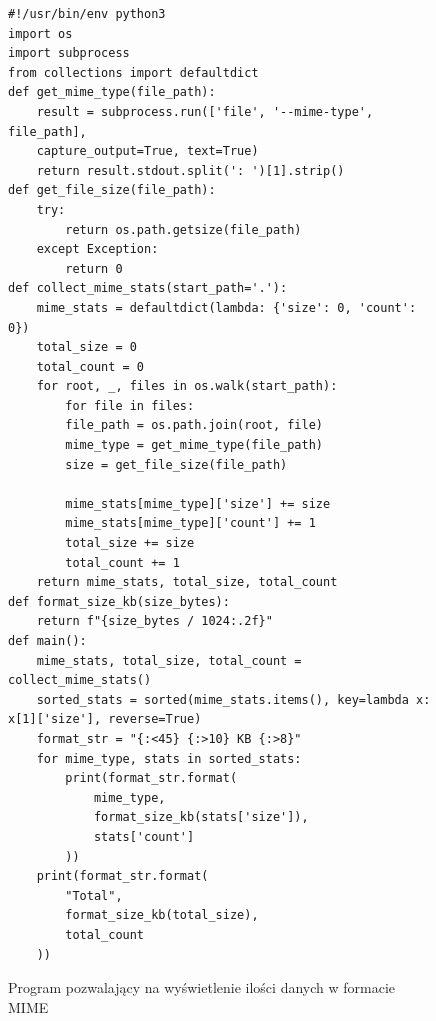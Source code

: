 \begin{figure}[bp]
    \centering
    \begin{lstlisting}
#!/usr/bin/env python3
import os
import subprocess
from collections import defaultdict
def get_mime_type(file_path):
    result = subprocess.run(['file', '--mime-type', file_path], 
    capture_output=True, text=True)
    return result.stdout.split(': ')[1].strip()
def get_file_size(file_path):
    try:
        return os.path.getsize(file_path)
    except Exception:
        return 0
def collect_mime_stats(start_path='.'):
    mime_stats = defaultdict(lambda: {'size': 0, 'count': 0})
    total_size = 0
    total_count = 0
    for root, _, files in os.walk(start_path):
        for file in files:
        file_path = os.path.join(root, file)
        mime_type = get_mime_type(file_path)
        size = get_file_size(file_path)
        
        mime_stats[mime_type]['size'] += size
        mime_stats[mime_type]['count'] += 1
        total_size += size
        total_count += 1
    return mime_stats, total_size, total_count
def format_size_kb(size_bytes):
    return f"{size_bytes / 1024:.2f}"
def main():
    mime_stats, total_size, total_count = collect_mime_stats()
    sorted_stats = sorted(mime_stats.items(), key=lambda x: x[1]['size'], reverse=True)
    format_str = "{:<45} {:>10} KB {:>8}"
    for mime_type, stats in sorted_stats:
        print(format_str.format(
            mime_type,
            format_size_kb(stats['size']),
            stats['count']
        ))
    print(format_str.format(
        "Total",
        format_size_kb(total_size),
        total_count
    ))
    \end{lstlisting}
    \caption{Program pozwalający na wyświetlenie ilości danych w formacie MIME}
    \label{fig:code:pythonMimeProgram}
\end{figure}



